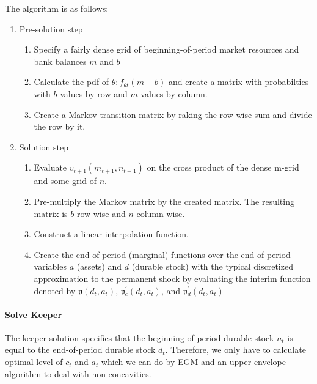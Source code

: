 \documentclass[\econtexMain]{subfiles}
\begin{document}
The algorithm is as follows:
\begin{enumerate}
	\item Pre-solution step
	\begin{enumerate}
		\item Specify a fairly dense grid of beginning-of-period market resources and bank balances $m$ and $b$
		\item Calculate the pdf of $\theta: f_{\theta t}(m - b)$ and create a matrix with probabilties with $b$ values by row and $m$ values by column.
		\item Create a Markov transition matrix by raking the row-wise sum and divide the row by it.
	\end{enumerate} 
	\item Solution step
	\begin{enumerate}
		\item Evaluate $v_{t+1}(m_{t+1}, n_{t+1})$ on the cross product of the dense m-grid and some grid of $n$.
		\item Pre-multiply the Markov matrix by the created matrix. The resulting matrix is $b$ row-wise and $n$ column wise.
		\item Construct a linear interpolation function.
		\item Create the end-of-period (marginal) functions over the end-of-period variables $a$ (assets) and $d$ (durable stock) with the typical discretized approximation to the permanent shock by evaluating the interim function denoted by $\mathfrak{v}(d_t, a_t)$, $\mathfrak{v}^{'}_c(d_t, a_t)$, and $\mathfrak{v}^{'}_d(d_t, a_t)$
	\end{enumerate}
\end{enumerate}
	
	
\paragraph{Solve Keeper}
The keeper solution specifies that the beginning-of-period durable stock $n_t$ is equal to the end-of-period durable stock $d_t$. Therefore, we only have to calculate optimal level of $c_t$ and $a_t$ which we can do by EGM and an upper-envelope algorithm to deal with non-concavities.
\end{document}
